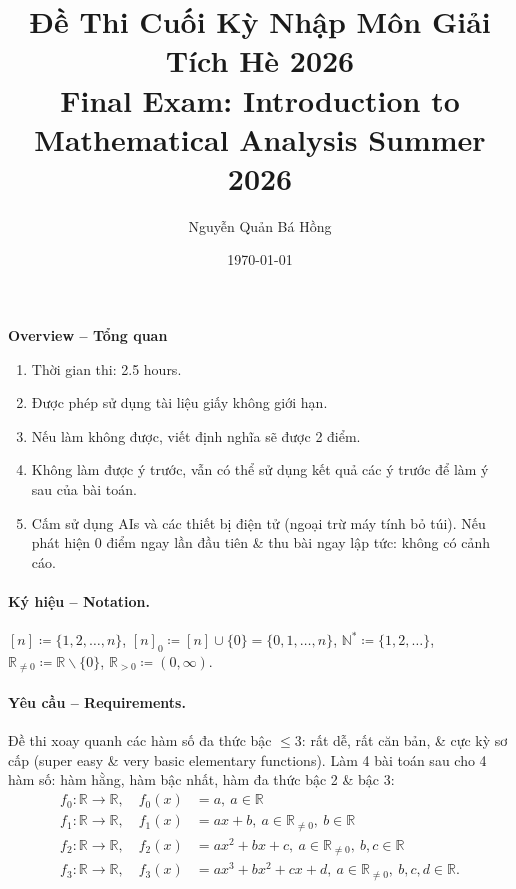 \documentclass[12pt]{article}
\author{Nguyễn Quản Bá Hồng}
\title{Đề Thi Cuối Kỳ Nhập Môn Giải Tích Hè 2026\\Final Exam: Introduction to Mathematical Analysis Summer 2026}
\date{\today}
\begin{document}
\maketitle
\begin{center}
	\textbf{\textsf{Overview -- Tổng quan}}
\end{center}

\begin{enumerate}
	\item Thời gian thi: 2.5 hours.
	\item Được phép sử dụng tài liệu giấy không giới hạn.
	\item Nếu làm không được, viết định nghĩa sẽ được 2 điểm.
	\item Không làm được ý trước, vẫn có thể sử dụng kết quả các ý trước để làm ý sau của bài toán.
	\item Cấm sử dụng AIs và các thiết bị điện tử (ngoại trừ máy tính bỏ túi). Nếu phát hiện 0 điểm ngay lần đầu tiên \& thu bài ngay lập tức: không có cảnh cáo.
\end{enumerate}

\paragraph{Ký hiệu -- Notation.} $[n]\coloneqq\{1,2,\ldots,n\}$, $[n]_0\coloneqq[n]\cup\{0\} = \{0,1,\ldots,n\}$, $\mathbb{N}^*\coloneqq\{1,2,\ldots\}$, $\mathbb{R}_{\ne0}\coloneqq\mathbb{R}\backslash\{0\}$, $\mathbb{R}_{> 0}\coloneqq(0,\infty)$.

\paragraph{Yêu cầu -- Requirements.} Đề thi xoay quanh các hàm số đa thức bậc $\le3$: rất dễ, rất căn bản, \& cực kỳ sơ cấp (super easy \& very basic elementary functions). Làm 4 bài toán sau cho 4 hàm số: hàm hằng, hàm bậc nhất, hàm đa thức bậc 2 \& bậc 3:
\begin{align*}
	f_0:\mathbb{R}\to\mathbb{R},\quad f_0(x) &= a,\ a\in\mathbb{R}\\
	f_1:\mathbb{R}\to\mathbb{R},\quad f_1(x) &= ax + b,\ a\in\mathbb{R}_{\ne0},\ b\in\mathbb{R}\\
	f_2:\mathbb{R}\to\mathbb{R},\quad f_2(x) &= ax^2 + bx + c,\ a\in\mathbb{R}_{\ne0},\ b,c\in\mathbb{R}\\
	f_3:\mathbb{R}\to\mathbb{R},\quad f_3(x) &= ax^3 + bx^2 + cx + d,\ a\in\mathbb{R}_{\ne0},\ b,c,d\in\mathbb{R}.
\end{align*}
\end{document}
